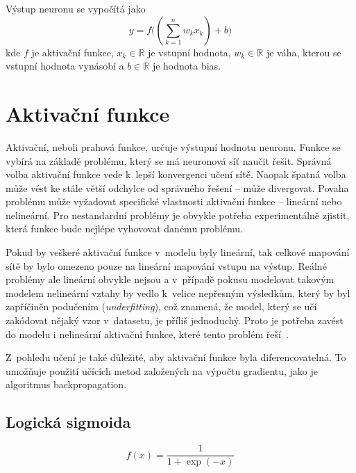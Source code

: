 Výstup neuronu se vypočítá jako
\begin{equation}
	y = f\Big((\sum_{k=1}^n w_kx_k) + b\Big)
\end{equation}
kde $f$ je aktivační funkce, $x_k \in \mathbb{R}$ je vstupní hodnota, $w_k \in \mathbb{R}$ je váha, kterou se vstupní hodnota vynásobí a $b \in \mathbb{R}$ je hodnota bias.


\section{Aktivační funkce}
Aktivační, neboli prahová funkce, určuje výstupní hodnotu neuronu. Funkce se vybírá na základě problému, který se má neuronová síť naučit řešit. Správná volba aktivační funkce vede k~lepší konvergenci učení sítě. Naopak špatná volba může vést ke stále větší odchylce od správného řešení -- může divergovat. Povaha problému může vyžadovat specifické vlastnosti aktivační funkce -- lineární nebo nelineární. Pro nestandardní problémy je obvykle potřeba experimentálně zjistit, která funkce bude nejlépe vyhovovat danému problému. 

Pokud by veškeré aktivační funkce v~modelu byly lineární, tak celkové mapování sítě by bylo omezeno pouze na lineární mapování vstupu na výstup. Reálné problémy ale lineární obvykle nejsou a v~případě pokusu modelovat takovým modelem nelineární vztahy by vedlo k~velice nepřesným výsledkům, který by byl zapříčiněn podučením (\textit{underfitting}), což znamená, že model, který se učí zakódovat nějaký vzor v~datasetu, je příliš jednoduchý. Proto je potřeba zavést do modelu i nelineární aktivační funkce, které tento problém řeší~\cite[p.~77--78]{mitdeeplearning_small}.

Z~pohledu učení je také důležité, aby aktivační funkce byla diferencovatelná. To umožňuje použití učících metod založených na výpočtu gradientu, jako je algoritmus backpropagation.



\subsection*{Logická sigmoida}
\begin{equation}
  f(x) = \frac{1}{1+\exp(-x)}
\end{equation}


